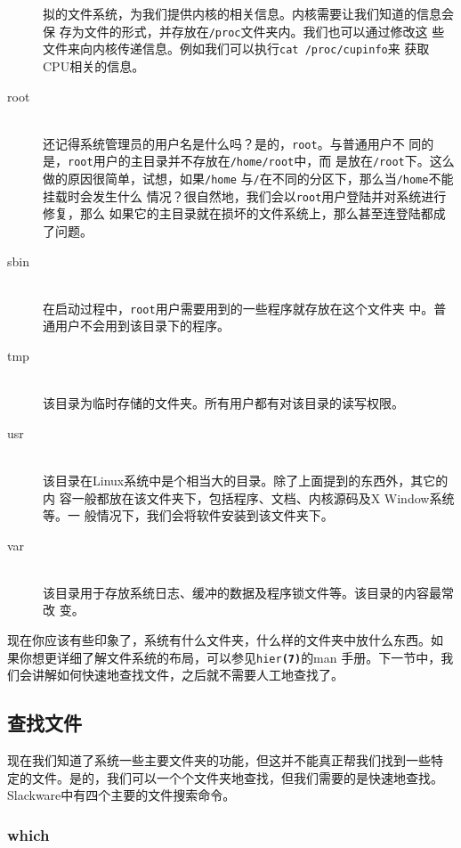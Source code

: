 \begin{description}
  拟的文件系统，为我们提供内核的相关信息。内核需要让我们知道的信息会保
  存为文件的形式，并存放在\texttt{/proc}文件夹内。我们也可以通过修改这
  些文件来向内核传递信息。例如我们可以执行\texttt{cat /proc/cupinfo}来
  获取CPU相关的信息。
\item[root] \hfill \\
  还记得系统管理员的用户名是什么吗？是的，\texttt{root}。与普通用户不
  同的是，\texttt{root}用户的主目录并不存放在\texttt{/home/root}中，而
  是放在\texttt{/root}下。这么做的原因很简单，试想，如果\texttt{/home}
  与\texttt{/}在不同的分区下，那么当\texttt{/home}不能挂载时会发生什么
  情况？很自然地，我们会以\texttt{root}用户登陆并对系统进行修复，那么
  如果它的主目录就在损坏的文件系统上，那么甚至连登陆都成了问题。
\item[sbin] \hfill \\
  在启动过程中，\texttt{root}用户需要用到的一些程序就存放在这个文件夹
  中。普通用户不会用到该目录下的程序。
\item[tmp] \hfill \\
  该目录为临时存储的文件夹。所有用户都有对该目录的读写权限。
\item[usr] \hfill \\
  该目录在Linux系统中是个相当大的目录。除了上面提到的东西外，其它的内
  容一般都放在该文件夹下，包括程序、文档、内核源码及X Window系统等。一
  般情况下，我们会将软件安装到该文件夹下。
\item[var] \hfill \\
  该目录用于存放系统日志、缓冲的数据及程序锁文件等。该目录的内容最常改
  变。
\end{description}
现在你应该有些印象了，系统有什么文件夹，什么样的文件夹中放什么东西。如
果你想更详细了解文件系统的布局，可以参见\texttt{hier\textbf{(7)}}的man
手册。下一节中，我们会讲解如何快速地查找文件，之后就不需要人工地查找了。

\subsection{查找文件}
\label{sec:systemConfig:systemOverview:findingFiles}
现在我们知道了系统一些主要文件夹的功能，但这并不能真正帮我们找到一些特
定的文件。是的，我们可以一个个文件夹地查找，但我们需要的是快速地查找。
Slackware中有四个主要的文件搜索命令。

\subsubsection{which}
\label{sec:systemConfig:systemOverview:findingFiles:which}


